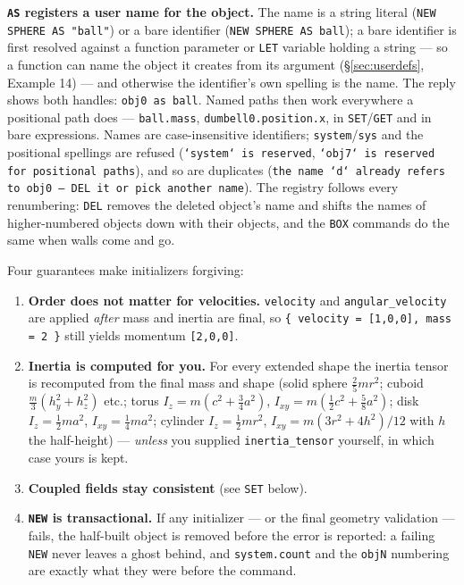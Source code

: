 \documentclass[11pt]{article}
\newcommand{\kw}[1]{\texttt{\uppercase{#1}}}
\newcommand{\code}[1]{\texttt{#1}}
\begin{document}
\textbf{\kw{as} registers a user name for the object.} The name is a
string literal (\code{NEW SPHERE AS "ball"}) or a bare identifier
(\code{NEW SPHERE AS ball}); a bare identifier is first resolved
against a function parameter or \kw{let} variable holding a string
--- so a function can name the object it creates from its argument
(\S\ref{sec:userdefs}, Example 14) --- and otherwise the
identifier's own spelling is the name. The reply shows both handles:
\code{obj0 as ball}. Named paths then work everywhere a positional
path does --- \code{ball.mass}, \code{dumbell0.position.x}, in
\kw{set}/\kw{get} and in bare expressions. Names are
case-insensitive identifiers; \code{system}/\code{sys} and the
positional spellings are refused (\code{`system` is reserved},
\code{`obj7` is reserved for positional paths}), and so are
duplicates (\code{the name `d` already refers to obj0 --- DEL it or
pick another name}). The registry follows every renumbering:
\kw{del} removes the deleted object's name and shifts the names of
higher-numbered objects down with their objects, and the \kw{box}
commands do the same when walls come and go.

Four guarantees make initializers forgiving:
\begin{enumerate}
\item \textbf{Order does not matter for velocities.} \code{velocity} and
      \code{angular\_velocity} are applied \emph{after} mass and inertia
      are final, so \code{\{ velocity = [1,0,0], mass = 2 \}} still
      yields momentum \code{[2,0,0]}.
\item \textbf{Inertia is computed for you.} For every extended shape
      the inertia tensor is recomputed from the final mass and shape
      (solid sphere $\tfrac{2}{5}mr^2$; cuboid $\tfrac{m}{3}(h_y^2+h_z^2)$
      etc.; torus $I_z = m(c^2+\tfrac34 a^2)$,
      $I_{xy} = m(\tfrac12 c^2+\tfrac58 a^2)$; disk
      $I_z = \tfrac12 ma^2$, $I_{xy} = \tfrac14 ma^2$; cylinder
      $I_z = \tfrac12 mr^2$, $I_{xy} = m(3r^2+4h^2)/12$ with $h$ the
      half-height) --- \emph{unless} you supplied
      \code{inertia\_tensor} yourself, in which case yours is kept.
\item \textbf{Coupled fields stay consistent} (see \kw{set} below).
\item \textbf{\kw{new} is transactional.} If any initializer --- or
      the final geometry validation --- fails, the half-built object
      is removed before the error is reported: a failing \kw{new}
      never leaves a ghost behind, and \code{system.count} and the
      \code{objN} numbering are exactly what they were before the
      command.
\end{enumerate}
\end{document}
